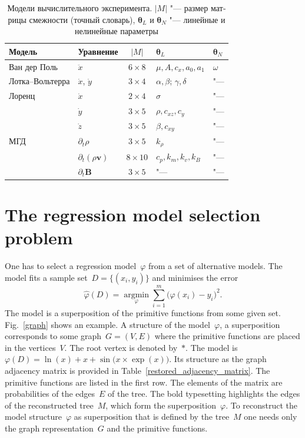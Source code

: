 \documentclass[12pt]{article}
\newif\ifhighlight \highlighttrue
\newenvironment{ru}{\begin{otherlanguage}{russian}\ifhighlight\color{blue}\fi}{\end{otherlanguage}}
\newcommand{\tht}{\bm{\theta}}
\begin{document}
\begin{table}[!ht]
\begin{ru}
\centering
\caption{Модели вычислительного эксперимента. $|M|$ "--- размер матрицы смежности (точный словарь), $\tht_L$ и $\tht_N$ "--- линейные и нелинейные параметры}
\label{tab:models}
\begin{tabular}{llcll}
\toprule
Модель & Уравнение & $|M|$ & $\tht_L$ & $\tht_N$\\
\midrule
Ван дер Поль & $\ddot x$ & $6\times8$ & $\mu, A, c_x, a_0, a_1$ & $\omega$\\
Лотка--Вольтерра & $\dot x$, $\dot y$ & $3\times4$ & $\alpha,\beta$; $\gamma,\delta$ & "---\\
Лоренц & $\dot x$ & $2\times4$ & $\sigma$ & "---\\
       & $\dot y$ & $3\times5$ & $\rho,c_{xz},c_y$ & "---\\
       & $\dot z$ & $3\times5$ & $\beta,c_{xy}$ & "---\\
МГД & $\partial_t\rho$ & $3\times5$ & $k_\rho$ & "---\\
    & $\partial_t(\rho\mathbf v)$ & $8\times10$ & $c_p, k_m, k_v, k_B$ & "---\\
    & $\partial_t\mathbf B$ & $3\times5$ & "--- & "---\\
\bottomrule
\end{tabular}
\end{ru}
\end{table}

\section{The regression model selection problem}

One has to select a regression model~$\varphi$ from a set of alternative models. The model fits a sample set~$D=\{(x_i,y_i)\}$ and minimises the error
\begin{equation}
\hat{\varphi}(D)=\mathop{\arg\min}\limits_\varphi\sum_{i=1}^m\bigl(\varphi(x_i)-y_i\bigr)^2.
\label{task_1}
\end{equation}
The model is a superposition of the primitive functions from some given set. Fig.~\ref{graph} shows an example.
A structure of the model~$\varphi$, a superposition corresponds to some graph~$G=(V,E)$ where the primitive functions are placed in the vertices~$V$. The {root} vertex is denoted by~$\ast$.  The model is~$\varphi(D) = \ln(x) + x + \sin\bigl(x\times \exp(x)\bigr)$. Its structure as the graph adjacency matrix is provided in Table~\ref{restored_adjacency_matrix}. The primitive functions are listed in the first row. The elements of the matrix are probabilities of the edges~$E$ of the tree. The bold typesetting highlights the edges of the reconstructed tree~$M$, which form the superposition~$\varphi$. To reconstruct the model structure~$\varphi$ as superposition that is defined by the tree~$M$ one needs only the graph representation~$G$ and the primitive functions.
\end{document}
